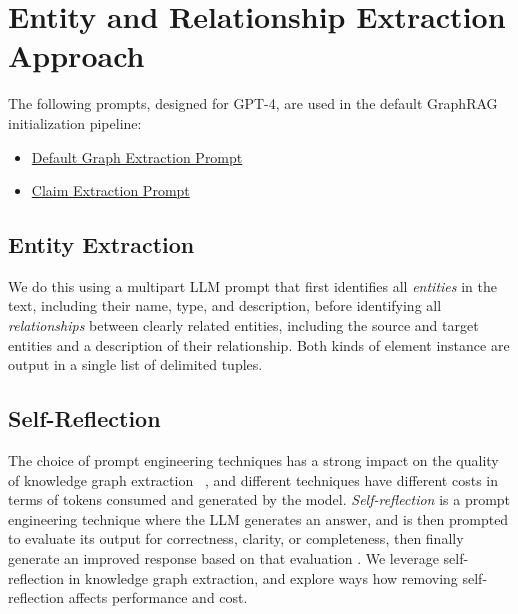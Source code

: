 \pagebreak
\section{Entity and Relationship Extraction Approach}
\label{app:prompts}

The following prompts, designed for GPT-4, are used in the default GraphRAG initialization pipeline:
\begin{itemize}
\item \href{https://github.com/microsoft/graphrag/blob/6d21ef268377e319a165ca2250bd6841737df1ad/graphrag/prompts/index/entity_extraction.py#L6}{Default Graph Extraction Prompt}
\item \href{https://github.com/microsoft/graphrag/blob/6d21ef268377e319a165ca2250bd6841737df1ad/graphrag/prompts/index/claim_extraction.py#L1}{Claim Extraction Prompt}
\end{itemize}

\subsection{Entity Extraction}
\label{app:entity}
We do this using a multipart LLM prompt that first identifies all \emph{entities} in the text, including their name, type, and description, before identifying all \emph{relationships} between clearly related entities, including the source and target entities and a description of their relationship. Both kinds of element instance are output in a single list of delimited tuples.

\subsection{Self-Reflection}
\label{app:self_reflection}

The choice of prompt engineering techniques has a strong impact on the quality of knowledge graph extraction ~\citep{zhu2024llms}, and different techniques have different costs in terms of tokens consumed and generated by the model.
\emph{Self-reflection} is a prompt engineering technique where the LLM generates an answer, and is then prompted to evaluate its output for correctness, clarity, or completeness, then finally generate an improved response based on that evaluation \citep{huang2023large, shinn2024reflexion, wang2022self, madaan2024self}.
We leverage self-reflection in knowledge graph extraction, and explore ways how removing self-reflection affects performance and cost.

